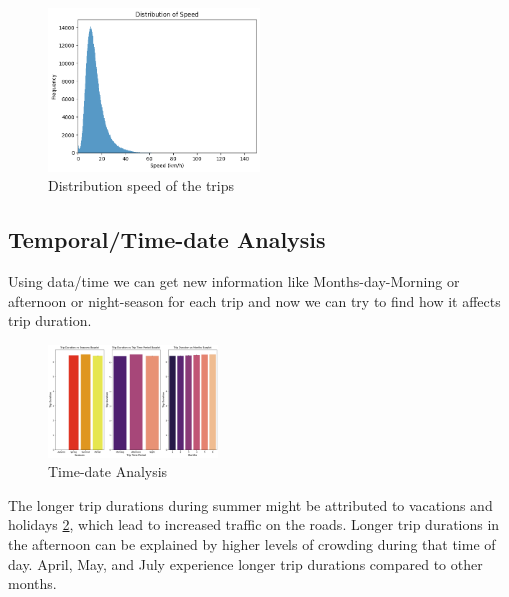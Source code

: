 \documentclass[twocolumn, 9pt]{extarticle}
\begin{document}
\begin{figure}[ht]
\centering
    \includegraphics[width=0.5\textwidth, height=0.25\textheight]{Speed.png}
    \caption{\label{fig:speed} Distribution speed of the trips}
\end{figure}

\newpage
\subsection{Temporal/Time-date Analysis}

\hfill \break
Using data/time we can get new information like Months-day-Morning or afternoon or night-season for each trip and now we can try to find how it affects trip duration.

\begin{figure}[ht]
\centering
    \includegraphics[width=0.4\textwidth, height=0.5\textheight]{time.png}
    \caption{\label{fig:time} Time-date Analysis}
\end{figure}


\hfill \break
The longer trip durations during summer might be attributed to vacations and holidays \ref{fig:time}, which lead to increased traffic on the roads.
Longer trip durations in the afternoon can be explained by higher levels of crowding during that time of day.
April, May, and July experience longer trip durations compared to other months.
\end{document}

